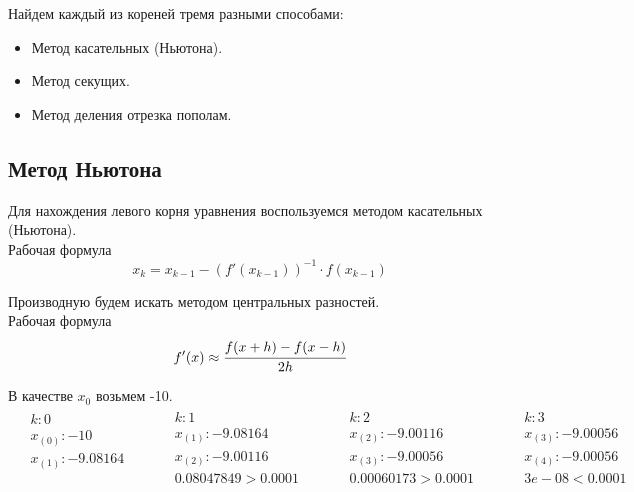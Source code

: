 \documentclass[letterpaper, 11pt]{extarticle}
\begin{document}
\noindent Найдем каждый из кореней тремя разными способами: 
\begin{itemize}
    \item Метод касательных (Ньютона).
    \item Метод секущих.
    \item Метод деления отрезка пополам.
\end{itemize}

\subsection*{Метод Ньютона}
Для нахождения левого корня уравнения воспользуемся методом касательных (Ньютона).\\
Рабочая формула
\begin{equation*}
    x_k = x_{k-1} - (f'(x_{k-1}))^{-1} \cdot f(x_{k-1})
\end{equation*}

\noindent Производную будем искать методом центральных разностей.\\
Рабочая формула
\begin{equation*}
    f'(x) \approx \cfrac{f(x + h) - f(x - h)}{2h}
\end{equation*}

\noindent В качестве $x_0$ возьмем -10.\\

\begin{align*}
    \begin{aligned}
        & k: 0 \\
        & x_{(0)}: -10 \\
        & x_{(1)}: -9.08164 \\
        & \\
    \end{aligned}
    \qquad
    \begin{aligned}
        & k: 1 \\
        & x_{(1)}: -9.08164 \\
        & x_{(2)}: -9.00116 \\
        & 0.08047849 > 0.0001
    \end{aligned}
    \qquad
    \begin{aligned}
        & k: 2 \\
        & x_{(2)}: -9.00116 \\
        & x_{(3)}: -9.00056 \\
        & 0.00060173 > 0.0001
    \end{aligned}
    \qquad
    \begin{aligned}
        & k: 3 \\
        & x_{(3)}: -9.00056 \\
        & x_{(4)}: -9.00056 \\
        & 3e-08 < 0.0001
    \end{aligned}
\end{align*}\\
\end{document}
